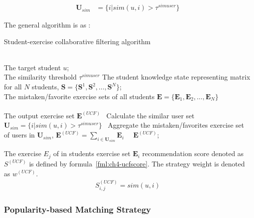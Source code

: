 \begin{align}
    \mathbf{U}_{sim} & =\{i|sim(u,i)>\tau^{simuser}\}  \label{fml:ch4-simuserset}
\end{align}

The general algorithm is as \algoname{\ref{alg:ch4-CF}}:
\begin{algorithm}[htbp!]
    \caption{Student-exercise collaborative filtering algorithm}\label{alg:ch4-CF}
    \begin{algorithmic}
        \REQUIRE~~\\
        The target student \(u\); \\
        The similarity threshold \(\tau^{simuser}\)
        The student knowledge state representing matrix for all \(N\) students, \(\mathbf{S}=\{\mathbf{S}^1,\mathbf{S}^2,\ldots,\mathbf{S}^N\} \);\\
        The mistaken/favorite exercise sets of all students \( \mathbf{E}=\{\mathbf{E}_1,\mathbf{E}_2,\ldots,\mathbf{E}_N\} \) \\
        \ENSURE~~\\ %
        The output exercise set \(\mathbf{E}^{(UCF)} \)
        \STATE~Calculate the similar user set \(\mathbf{U}_{sim}=\{i|sim(u,i)>\tau^{simuser}\}  \)
        \STATE~Aggregate the mistaken/favorites exercise set of users in \(\mathbf{U}_{sim}\), \(\mathbf{E}^{(UCF)}=\sum\limits_{i \in \mathbf{U}_{sim}}{\mathbf{E}_{i}}\)
        \RETURN~~\(\mathbf{E}^{(UCF)} \); %
    \end{algorithmic}
\end{algorithm}

The exercise \(E_j\) of in students exercise set \(\mathbf{E}_i\) recommendation score denoted as \(S^{(UCF)}\) is defined by formula~\ref{fml:ch4-ucfscore}. The strategy weight is denoted as \(w^{(UCF)}\).
\begin{align}\label{fml:ch4-ucfscore}
    S^{(UCF)}_{i,j} = sim(u,i)
\end{align}


\subsubsection{Popularity-based Matching Strategy}

